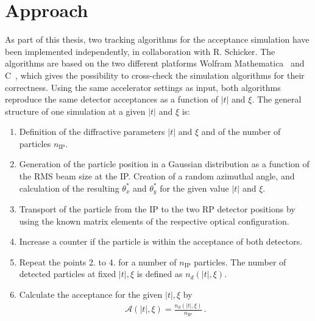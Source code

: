 \section{Approach}\label{chap:acceptance_simulations}
As part of this thesis, two tracking algorithms for the acceptance simulation have been implemented independently, in collaboration with R. Schicker. The algorithms are based on the two different platforms Wolfram Mathematica~\cite{trott2004mathematica} and C~\cite{ritchie1975c}, which gives the possibility to cross-check the simulation algorithms for their correctness. Using the same accelerator settings as input, both algorithms reproduce the same detector acceptances as a function of $|t|$ and $\xi$. The general structure of one simulation at a given $|t|$ and $\xi$ is:
%
\begin{enumerate}
\item Definition of the diffractive parameters $|t|$ and $\xi$ and of the number of particles $n_{\text{IP}}$. 
%
\item Generation of the particle position in a Gaussian distribution as a function of the RMS beam size at the IP. Creation of a random azimuthal angle, and calculation of the resulting $\theta_x^*$ and $\theta_y^*$ for the given value $|t|$ and $\xi$.
%
\item Transport of the particle from the IP to the two RP detector positions by using the known matrix elements of the respective optical configuration.
%
\item Increase a counter if the particle is within the acceptance of both detectors.
%
\item Repeat the points 2. to 4. for a number of $n_{\text{IP}}$ particles. The number of detected particles at fixed $|t|,\xi$ is defined as $n_d(|t|,\xi)$.
%
\item Calculate the acceptance for the given $|t|,\xi$ by 
%
\begin{align}
\mathcal{A}(|t|,\xi) = \frac{n_d(|t|,\xi)}{n_{\text{IP}}} \, .
\end{align}
%
\end{enumerate}
%
%

